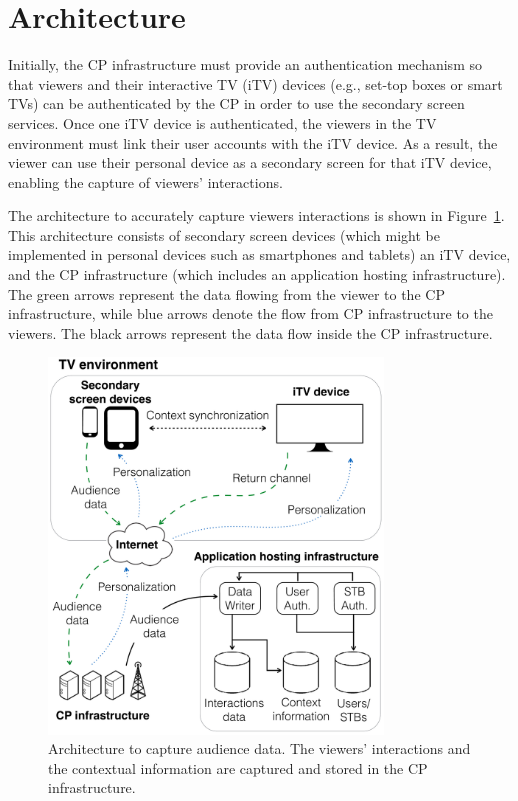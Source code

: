 \documentclass[conference,a4paper]{IEEEtran}
\begin{document}
\section{Architecture}

Initially, the CP infrastructure must provide an authentication mechanism so that viewers and their interactive TV (iTV) devices (e.g., set-top boxes or smart TVs) can be authenticated by the CP in order to use the secondary screen services. Once one iTV device is authenticated, the viewers in the TV environment must link their user accounts with the iTV device. As a result, the viewer can use their personal device as a secondary screen for that iTV device, enabling the capture of viewers' interactions.

The architecture to accurately capture viewers interactions is shown in Figure~\ref{fig_architecture}. This architecture consists of secondary screen devices (which might be implemented in personal devices such as smartphones and tablets) an iTV device, and the CP infrastructure (which includes an application hosting infrastructure). The green arrows represent the data flowing from the viewer to the CP infrastructure, while blue arrows denote the flow from CP infrastructure to the viewers. The black arrows represent the data flow inside the CP infrastructure.

\begin{figure}[!t]
	\centering
	\includegraphics[width=3.5in]{img/architecture.pdf}
	\caption{Architecture to capture audience data. The viewers' interactions and the contextual information are captured and stored in the CP infrastructure.}
	\label{fig_architecture}
\end{figure}
\end{document}
